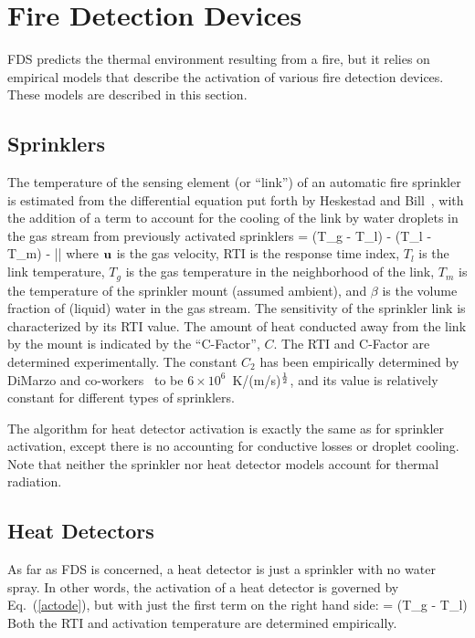 
\chapter{Fire Detection Devices}

FDS predicts the thermal environment resulting from a fire, but it relies on empirical models that describe the
activation of various fire detection devices. These models are described in this section.


\section{Sprinklers}

The temperature of the sensing element (or ``link'') of an automatic fire sprinkler is estimated from
the differential equation put forth by Heskestad and Bill~\cite{Heskestad:3},
with the addition of a term to account for the cooling of the link
by water droplets in the gas stream from previously activated
sprinklers
\be {} =  (T_g - T_l) -
    (T_l - T_m) -  \beta |\bu|
   \label{actode} \ee
where ${\bf u}$ is the gas velocity, RTI is the response time index, $T_l$ is the link temperature,
$T_g$ is the gas temperature in the neighborhood of the link,
$T_m$ is the temperature of the sprinkler mount (assumed ambient),
and $\beta$ is the volume fraction of (liquid) water in the
gas stream. The sensitivity of the sprinkler link is characterized by
its RTI value. The amount of heat conducted away from the
link by the mount is indicated by the ``C-Factor'', $C$. The RTI and
C-Factor are determined experimentally. The constant
$C_2$ has been empirically determined by DiMarzo and
co-workers~\cite{Ruffino:1,Ruffino:2,Gavelli:1} to
be $6\times 10^6$~K/(m/s)$^{\frac{1}{2}}$, and its value is relatively constant
for different types of sprinklers.

The algorithm for heat detector activation is exactly the same as for
sprinkler activation, except there is no accounting for conductive losses or
droplet cooling. Note that neither the sprinkler nor heat detector models account for
thermal radiation.

\section{Heat Detectors}

As far as FDS is concerned, a heat detector is just a sprinkler with no water spray. In other words, the activation of a heat
detector is governed by Eq.~(\ref{actode}), but with just the first term on the right hand side:
\be {} =  (T_g - T_l)  \label{heatactode} \ee
Both the RTI and activation temperature are determined empirically.


